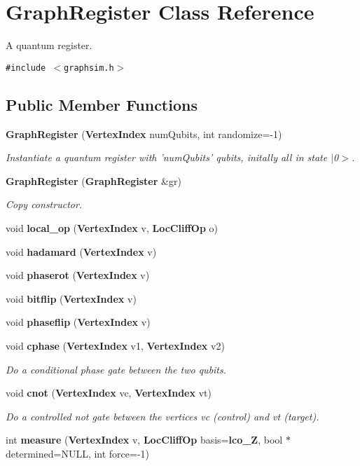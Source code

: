 \section{Graph\-Register Class Reference}
\label{classGraphRegister}
A quantum register.  


{\tt \#include $<$graphsim.h$>$}

\subsection*{Public Member Functions}
\begin{CompactItemize}
\item 
{\bf Graph\-Register} ({\bf Vertex\-Index} num\-Qubits, int randomize=-1)
\begin{CompactList}\small\item\em Instantiate a quantum register with 'num\-Qubits' qubits, initally all in state $|$0$>$. \item\end{CompactList}\item 
{\bf Graph\-Register} ({\bf Graph\-Register} \&gr)
\begin{CompactList}\small\item\em Copy constructor. \item\end{CompactList}\item 
void {\bf local\_\-op} ({\bf Vertex\-Index} v, {\bf Loc\-Cliff\-Op} o)
\item 
void {\bf hadamard} ({\bf Vertex\-Index} v)
\item 
void {\bf phaserot} ({\bf Vertex\-Index} v)
\item 
void {\bf bitflip} ({\bf Vertex\-Index} v)
\item 
void {\bf phaseflip} ({\bf Vertex\-Index} v)
\item 
void {\bf cphase} ({\bf Vertex\-Index} v1, {\bf Vertex\-Index} v2)\label{classGraphRegister_a8}

\begin{CompactList}\small\item\em Do a conditional phase gate between the two qubits. \item\end{CompactList}\item 
void {\bf cnot} ({\bf Vertex\-Index} vc, {\bf Vertex\-Index} vt)\label{classGraphRegister_a9}

\begin{CompactList}\small\item\em Do a controlled not gate between the vertices vc (control) and vt (target). \item\end{CompactList}\item 
int {\bf measure} ({\bf Vertex\-Index} v, {\bf Loc\-Cliff\-Op} basis={\bf lco\_\-Z}, bool $\ast$determined=NULL, int force=-1)\label{classGraphRegister_a10}


\end{CompactItemize}

